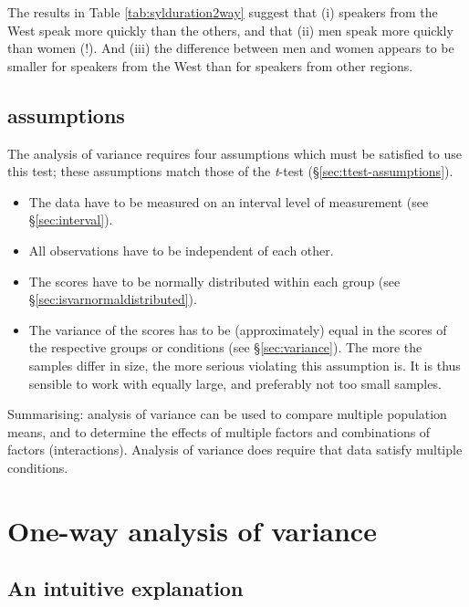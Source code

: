 \documentclass[
]{book}
\begin{document}
The results in Table \ref{tab:sylduration2way} suggest that (i) speakers from the
West speak more quickly than the others, and that (ii) men speak more quickly than
women (!). And (iii) the difference between men and women appears to be smaller
for speakers from the West than for speakers from other regions.

\hypertarget{assumptions}{%
\subsection{assumptions}\label{assumptions}}

The analysis of variance requires four assumptions which
must be satisfied to use this test; these assumptions match those of the
\emph{t}-test
(§\ref{sec:ttest-assumptions}).

\begin{itemize}
\item
  The data have to be measured on an interval level of measurement (see
  §\ref{sec:interval}).
\item
  All observations have to be independent of each other.
\item
  The scores have to be normally distributed within each group (see
  §\ref{sec:isvarnormaldistributed}).
\item
  The variance of the scores has to be (approximately) equal in
  the scores of the respective groups or conditions (see
  §\ref{sec:variance}).
  The more the samples differ in size, the more serious
  violating this assumption is. It is thus sensible to work with
  equally large, and preferably not too small samples.
\end{itemize}

Summarising: analysis of variance can be used to compare multiple
population means, and to determine the effects of multiple
factors and combinations of factors (interactions).
Analysis of variance does require that data satisfy multiple
conditions.

\hypertarget{one-way-analysis-of-variance}{%
\section{One-way analysis of variance}\label{one-way-analysis-of-variance}}

\hypertarget{sec:anova-oneway-explanation}{%
\subsection{An intuitive explanation}\label{sec:anova-oneway-explanation}}
\end{document}
